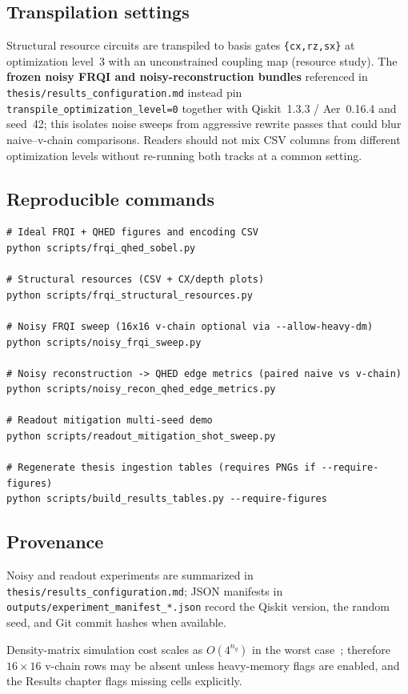 \subsection{Transpilation settings}
Structural resource circuits are transpiled to basis gates \texttt{\{cx,rz,sx\}} at optimization level~3 with an unconstrained coupling map (resource study). The \textbf{frozen noisy FRQI and noisy-reconstruction bundles} referenced in \texttt{thesis/results\_configuration.md} instead pin \texttt{transpile\_optimization\_level=0} together with Qiskit~1.3.3 / Aer~0.16.4 and seed~42; this isolates noise sweeps from aggressive rewrite passes that could blur naive--v-chain comparisons. Readers should not mix CSV columns from different optimization levels without re-running both tracks at a common setting.

\subsection{Reproducible commands}
\begin{lstlisting}[language={}, basicstyle=\ttfamily\footnotesize, frame=single, breaklines=true]
# Ideal FRQI + QHED figures and encoding CSV
python scripts/frqi_qhed_sobel.py

# Structural resources (CSV + CX/depth plots)
python scripts/frqi_structural_resources.py

# Noisy FRQI sweep (16x16 v-chain optional via --allow-heavy-dm)
python scripts/noisy_frqi_sweep.py

# Noisy reconstruction -> QHED edge metrics (paired naive vs v-chain)
python scripts/noisy_recon_qhed_edge_metrics.py

# Readout mitigation multi-seed demo
python scripts/readout_mitigation_shot_sweep.py

# Regenerate thesis ingestion tables (requires PNGs if --require-figures)
python scripts/build_results_tables.py --require-figures
\end{lstlisting}

\subsection{Provenance}
Noisy and readout experiments are summarized in \texttt{thesis/results\_configuration.md}; JSON manifests in \texttt{outputs/experiment\_manifest\_*.json} record the Qiskit version, the random seed, and Git commit hashes when available.

Density-matrix simulation cost scales as $O(4^{n_q})$ in the worst case~\cite{NielsenChuang2010}; therefore $16\times16$ v-chain rows may be absent unless heavy-memory flags are enabled, and the Results chapter flags missing cells explicitly.

